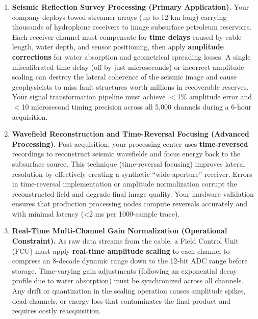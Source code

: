 \documentclass[11pt,letterpaper]{article}
\begin{document}
\begin{enumerate}[leftmargin=0.4in]
    \item \textbf{Seismic Reflection Survey Processing (Primary Application).} Your company deploys towed streamer arrays (up to 12 km long) carrying thousands of hydrophone receivers to image subsurface petroleum reservoirs. Each receiver channel must compensate for \textbf{time delays} caused by cable length, water depth, and sensor positioning, then apply \textbf{amplitude corrections} for water absorption and geometrical spreading losses. A single miscalibrated time delay (off by just microseconds) or incorrect amplitude scaling can destroy the lateral coherence of the seismic image and cause geophysicists to miss fault structures worth millions in recoverable reserves. Your signal transformation pipeline must achieve $<$1\% amplitude error and $<$10 microsecond timing precision across all 5,000 channels during a 6-hour acquisition.

    \item \textbf{Wavefield Reconstruction and Time-Reversal Focusing (Advanced Processing).} Post-acquisition, your processing center uses \textbf{time-reversed} recordings to reconstruct seismic wavefields and focus energy back to the subsurface source. This technique (time-reversal focusing) improves lateral resolution by effectively creating a synthetic ``wide-aperture'' receiver. Errors in time-reversal implementation or amplitude normalization corrupt the reconstructed field and degrade final image quality. Your hardware validation ensures that production processing nodes compute reversals accurately and with minimal latency (<2 ms per 1000-sample trace).

    \item \textbf{Real-Time Multi-Channel Gain Normalization (Operational Constraint).} As raw data streams from the cable, a Field Control Unit (FCU) must apply \textbf{real-time amplitude scaling} to each channel to compress an 8-decade dynamic range down to the 12-bit ADC range before storage. Time-varying gain adjustments (following an exponential decay profile due to water absorption) must be synchronized across all channels. Any drift or quantization in the scaling operation causes amplitude spikes, dead channels, or energy loss that contaminates the final product and requires costly reacquisition.
\end{enumerate}
\end{document}
